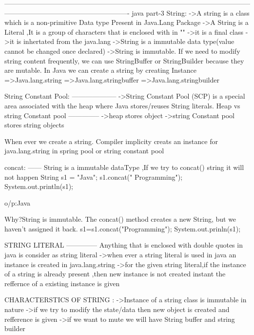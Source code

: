 {                                

-------------------------------------------------------------------------------------------------------------------------------------------------------------------
                                                            java part-3
String:
->A string is a class which is a non-primitive Data type Present in Java.Lang Package
->A String is a Literal ,It is a group of characters that is enclosed with in ""
->it is a final class
->it is inhertated from the java.lang
->String is a immutable data type(value cannot be changed once declared)
->String is immutable. If we need to modify string content frequently, we can use StringBuffer or StringBuilder because they are mutable.
In Java we can create a string by creating Instance
    =>Java.lang.string
    =>Java.lang.stringbuffer
    =>Java.lang.stringbuilder

String Constant Pool:
--------------------
          ->String Constant Pool (SCP) is a special area associated with the heap where Java stores/reuses String literals.
   Heap vs string Constant pool
   --------------
             ->heap stores object
             ->string Constant pool stores string objects 

When ever we create a string. Compiler implicity creats an instance for java.lang.string in spring pool or string constant pool

concat:
------
	String is a immutable dataType ,If we try to concat() string it will not happen
	String s1 = "Java";
	s1.concat(" Programming");
	System.out.println(s1);
	
	o/p:Java
	
	Why?String is immutable. The concat() method creates a new String, but we haven't assigned it back.
	s1=s1.concat("Programming");
	System.out.prinln(s1);

STRING LITERAL
--------------
          Anything that is enclosed with double quotes in java is consider as string literal
          ->when ever a string literal is used in java an instance is created in java.lang.string
          ->for the given string literal,if the instance of a string is already present ,then new instance is not created instant the reffernce of a existing instance is given

CHARACTERSTICS OF STRING :
              ->Instance of a string class is immutable in nature 
              ->if we try to modify the state/data then new object is created and refference is given
              ->if we want to mute we will have String buffer and string builder


}
